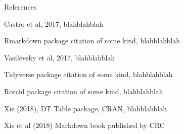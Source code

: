 \documentclass[ignorenonframetext,]{beamer}
\begin{document}
\begin{frame}{References}

Castro et al, 2017, blahblahblah

Rmarkdown package citation of some kind, blahblahblah

Vasilevsky et al, 2017, blahblahblah

Tidyverse package citation of some kind, blahblahblah

Rorcid package citation of some kind, blahblahblah

Xie (2018), DT Table package, CRAN, blahblahblah

Xie et al (2018) Markdown book published by CRC

\end{frame}
\end{document}
